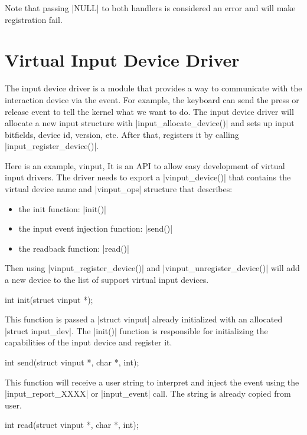 \documentclass[10pt, oneside]{book}
\begin{document}
Note that passing \cpp|NULL| to both handlers is considered an error and will make registration fail.

\section{Virtual Input Device Driver}
\label{sec:vinput}
The input device driver is a module that provides a way to communicate with the interaction device via the event.
For example, the keyboard can send the press or release event to tell the kernel what we want to do.
The input device driver will allocate a new input structure with \cpp|input_allocate_device()| and sets up input bitfields, device id, version, etc.
After that, registers it by calling \cpp|input_register_device()|.

Here is an example, vinput,
It is an API to allow easy development of virtual input drivers.
The driver needs to export a \cpp|vinput_device()| that contains the virtual device name and \cpp|vinput_ops| structure that describes:

\begin{itemize}
  \item the init function: \cpp|init()|
  \item the input event injection function: \cpp|send()|
  \item the readback function: \cpp|read()|
\end{itemize}

Then using \cpp|vinput_register_device()| and \cpp|vinput_unregister_device()| will add a new device to the list of support virtual input devices.

\begin{code}
int init(struct vinput *);
\end{code}

This function is passed a \cpp|struct vinput| already initialized with an allocated \cpp|struct input_dev|.
The \cpp|init()| function is responsible for initializing the capabilities of the input device and register it.

\begin{code}
int send(struct vinput *, char *, int);
\end{code}

This function will receive a user string to interpret and inject the event using the \cpp|input_report_XXXX| or \cpp|input_event| call.
The string is already copied from user.

\begin{code}
int read(struct vinput *, char *, int);
\end{code}
\end{document}
